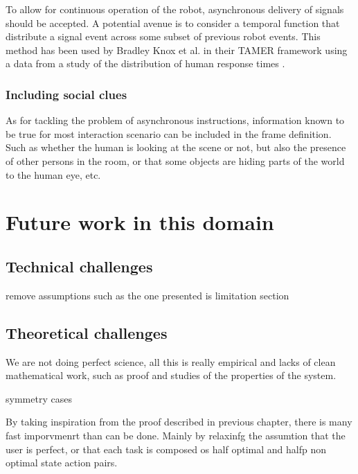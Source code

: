 To allow for continuous operation of the robot, asynchronous delivery of signals should be accepted. A potential avenue is to consider a temporal function that distribute a signal event across some subset of previous robot events. This method has been used by Bradley Knox et al. in their TAMER framework \cite{knox2009interactively} using a data from a study of the distribution of human response times \cite{hockley1984analysis}.

\subsubsection*{Including social clues}

As for tackling the problem of asynchronous instructions, information known to be true for most interaction scenario can be included in the frame definition.  Such as whether the human is looking at the scene or not, but also the presence of other persons in the room, or that some objects are hiding parts of the world to the human eye, etc.



\section{Future work in this domain}


\subsection{Technical challenges}

remove assumptions such as the one presented is limitation section

\subsection{Theoretical challenges}

We are not doing perfect science, all this is really empirical and lacks of clean mathematical work, such as proof and studies of the properties of the system. 

symmetry cases

By taking inspiration from the proof described in previous chapter, there is many fast imporvmenrt than can be done. Mainly by relaxinfg the assumtion that the user is perfect, or that each task is composed os half optimal and halfp non optimal state action pairs.


